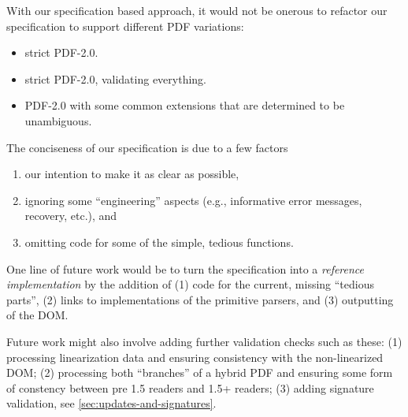 With our specification based approach, it would not be onerous
to refactor our specification to support different PDF variations:
\begin{itemize}
\item strict PDF-2.0.
\item strict PDF-2.0, validating everything.
\item PDF-2.0 with some common extensions that are determined to be unambiguous.
\end{itemize}

The conciseness of our specification is due to a few factors
\begin{enumerate}
\item our intention to make it as clear as possible,
\item ignoring some ``engineering'' aspects (e.g., informative error
   messages, recovery, etc.), and
\item omitting code for some of the simple, tedious functions.
\end{enumerate}
One line of future work would be to turn the specification into a
\emph{reference implementation} by the addition of
(1) code for the current, missing ``tedious parts'',
(2) links to implementations of the primitive parsers, and
(3) outputting of the DOM.

Future work might also involve adding further validation checks such as these:
(1) processing linearization data and ensuring consistency with the
non-linearized DOM;
(2) processing both ``branches'' of a hybrid PDF and ensuring
some form of constency between pre 1.5 readers and 1.5+ readers;
(3) adding signature validation, see \cref{sec:updates-and-signatures}.


\iffalse
\begin{code}

trailersConsistentAcrossUpdates :: [Update] -> Bool
trailersConsistentAcrossUpdates = stub

-- signatures above:
removeFrees m = M.mapMaybe
                  (\x -> case x of Right y -> Just y
                                   _       -> Nothing)
                  m
thawXRefEntry = notImplementedYet
getObjIds = notImplementedYet

\end{code}
\fi

